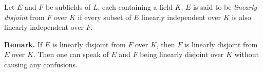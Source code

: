 \documentclass[12pt]{article}
\begin{document}
Let $E$ and $F$ be subfields of $L$, each containing a field $K$.  $E$ is said to be \emph{linearly disjoint} from $F$ over $K$ if every subset of $E$ linearly independent over $K$ is also linearly independent over $F$.

\textbf{Remark.}  If $E$ is linearly disjoint from $F$ over $K$, then $F$ is linearly disjoint from $E$ over $K$.  Then one can speak of $E$ and $F$ being linearly disjoint over $K$ without causing any confusions.
\end{document}
